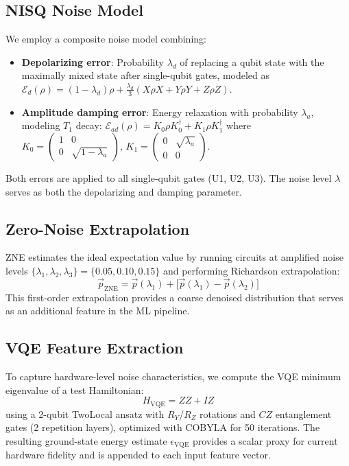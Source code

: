 \documentclass[journal]{IEEEtran}
\begin{document}
\subsection{NISQ Noise Model}

We employ a composite noise model combining:
\begin{itemize}
  \item \textbf{Depolarizing error}: Probability $\lambda_d$ of replacing a qubit state with the maximally mixed state after single-qubit gates, modeled as $\mathcal{E}_d(\rho) = (1-\lambda_d)\rho + \frac{\lambda_d}{3}(X\rho X + Y\rho Y + Z\rho Z)$.
  \item \textbf{Amplitude damping error}: Energy relaxation with probability $\lambda_a$, modeling $T_1$ decay: $\mathcal{E}_{ad}(\rho) = K_0\rho K_0^\dagger + K_1\rho K_1^\dagger$ where $K_0 = \begin{pmatrix}1 & 0 \\ 0 & \sqrt{1-\lambda_a}\end{pmatrix}$, $K_1 = \begin{pmatrix}0 & \sqrt{\lambda_a} \\ 0 & 0\end{pmatrix}$.
\end{itemize}
Both errors are applied to all single-qubit gates (U1, U2, U3). The noise level $\lambda$ serves as both the depolarizing and damping parameter.

\subsection{Zero-Noise Extrapolation}

ZNE estimates the ideal expectation value by running circuits at amplified noise levels $\{\lambda_1, \lambda_2, \lambda_3\} = \{0.05, 0.10, 0.15\}$ and performing Richardson extrapolation:
\begin{equation}
  \vec{p}_{\text{ZNE}} = \vec{p}(\lambda_1) + \bigl[\vec{p}(\lambda_1) - \vec{p}(\lambda_2)\bigr]
\end{equation}
This first-order extrapolation provides a coarse denoised distribution that serves as an additional feature in the ML pipeline.

\subsection{VQE Feature Extraction}

To capture hardware-level noise characteristics, we compute the VQE minimum eigenvalue of a test Hamiltonian:
\begin{equation}
  H_{\text{VQE}} = ZZ + IZ
\end{equation}
using a 2-qubit TwoLocal ansatz with $R_Y$/$R_Z$ rotations and $CZ$ entanglement gates (2 repetition layers), optimized with COBYLA for 50 iterations. The resulting ground-state energy estimate $\epsilon_{\text{VQE}}$ provides a scalar proxy for current hardware fidelity and is appended to each input feature vector.
\end{document}

